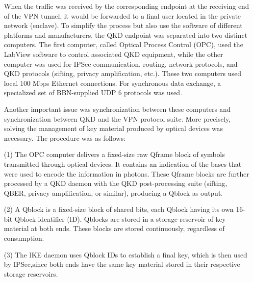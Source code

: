 When the traffic was received by the corresponding endpoint at the receiving end of the VPN tunnel, it would be forwarded to a final user located in the private network (enclave).
To simplify the process but also use the software of different platforms and manufacturers, the QKD endpoint was separated into two distinct computers. The first computer, called Optical Process Control (OPC), used the LabView software to control associated QKD equipment, while the other computer was used for IPSec communication, routing, network protocols, and QKD protocols (sifting, privacy amplification, etc.). These two computers used local 100 Mbps Ethernet connections. For synchronous data exchange, a specialized set of BBN-supplied UDP 6 protocols was used.

Another important issue was synchronization between these computers and synchronization between QKD and the VPN protocol suite. More precisely, solving the management of key material produced by optical devices was necessary. The procedure was as follows:

(1) The OPC computer delivers a fixed-size raw Qframe block of symbols transmitted through optical devices. It contains an indication of the bases that were used to encode the information in photons. These Qframe blocks are further processed by a QKD daemon with the QKD post-processing suite (sifting, QBER, privacy amplification, or similar), producing a Qblock as output.

(2) A Qblock is a fixed-size block of shared bits, each Qblock having its own 16-bit Qblock identifier (ID). Qblocks are stored in a storage reservoir of key material at both ends. These blocks are stored continuously, regardless of consumption.

(3) The IKE daemon uses Qblock IDs to establish a final key, which is then used by IPSec,since both ends have the same key material stored in their respective storage reservoirs.


